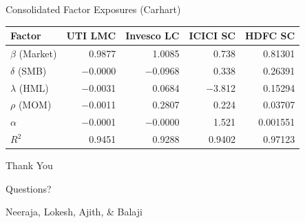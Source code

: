 \documentclass[11pt, aspectratio=43]{beamer}
\begin{document}
\begin{frame}{Consolidated Factor Exposures (Carhart)}
\centering
\small
\begin{tabular}{l r r r r}
\toprule
\textbf{Factor} & \textbf{UTI LMC} & \textbf{Invesco LC} & \textbf{ICICI SC} & \textbf{HDFC SC} \\
\midrule
$\beta$ (Market) & \textcolor{posgreen}{0.9877} & \textcolor{posgreen}{1.0085 } & \textcolor{posgreen}{0.738} & \textcolor{posgreen}{0.81301} \\
$\delta$ (SMB) & $-$0.0000 & $-$0.0968 & 0.338 &  \textcolor{posgreen}{0.26391} \\
$\lambda$ (HML) & \textcolor{posgreen}{$-$0.0031} & 0.0684 &  \textcolor{posgreen}{$-$3.812} & 0.15294 \\
$\rho$ (MOM) & $-$0.0011 &  \textcolor{posgreen}{0.2807} & 0.224 & 0.03707 \\
$\alpha$ & $-$0.0001 & $-$0.0000 & \textcolor{posgreen}{1.521} &  \textcolor{posgreen}{0.001551} \\
$R^2$ & 0.9451 & 0.9288 & 0.9402 & 0.97123 \\
\bottomrule
\end{tabular}

\vspace{0.8em}
\end{frame}



\begin{frame}{}
    \centering
    \vspace{2em}
    {\Huge Thank You}

    \vspace{1.5em}
    {\large Questions?}

    \vspace{2em}
    {\small Neeraja, Lokesh, Ajith, \& Balaji}
\end{frame}
\end{document}
